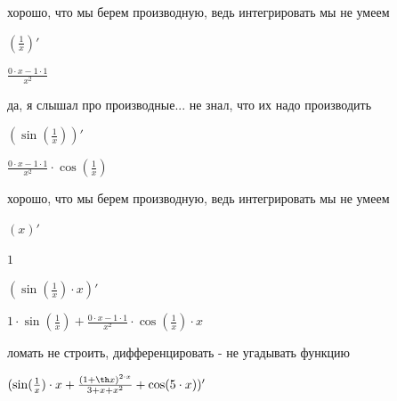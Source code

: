 \documentclass[a4paper,12pt]{article}
\begin{document}
хорошо, что мы берем производную, ведь интегрировать мы не умеем 

\begin{center}$( \frac{1}{x} )'$

\end{center}



\begin{center}$ \frac{0 \cdot x-1 \cdot 1}{x^{2}} $

\end{center}

да, я слышал про производные... не знал, что их надо производить 

\begin{center}$( \sin ( \frac{1}{x} ))'$

\end{center}



\begin{center}$ \frac{0 \cdot x-1 \cdot 1}{x^{2}}  \cdot  \cos ( \frac{1}{x} )$

\end{center}

хорошо, что мы берем производную, ведь интегрировать мы не умеем 

\begin{center}$(x)'$

\end{center}



\begin{center}$1$

\end{center}

  

\begin{center}$( \sin ( \frac{1}{x} ) \cdot x)'$

\end{center}



\begin{center}$1 \cdot  \sin ( \frac{1}{x} )+ \frac{0 \cdot x-1 \cdot 1}{x^{2}}  \cdot  \cos ( \frac{1}{x} ) \cdot x$

\end{center}

ломать не строить, дифференцировать - не угадывать функцию 

\begin{center}$( \sin ( \frac{1}{x} ) \cdot x+ \frac{(1+ \th x)^{2 \cdot x}}{3+x+x^{2}} + \cos (5 \cdot x))'$

\end{center}
\end{document}
